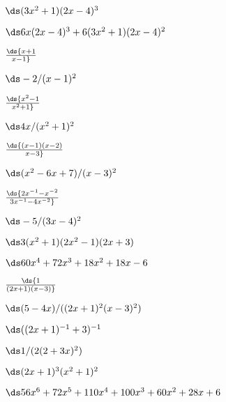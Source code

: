\begin{enumialphparenastyle}
\begin{ex}  $\ds (3x^2+1)(2x-4)^3$
\begin{sol} 
$\ds 6x(2x-4)^3+6(3x^2+1)(2x-4)^2$
\end{sol}
\end{ex}

\begin{ex}  $\ds{x+1\over x-1}$
\begin{sol} 
$\ds -2/(x-1)^2$
\end{sol}
\end{ex}

\begin{ex}  $\ds{x^2-1\over x^2+1}$
\begin{sol} 
$\ds 4x/(x^2+1)^2$
\end{sol}
\end{ex}

\begin{ex}  $\ds{(x-1)(x-2)\over x-3}$
\begin{sol} 
$\ds (x^2-6x+7)/(x-3)^2$
\end{sol}
\end{ex}

\begin{ex}  $\ds{2x^{-1}-x^{-2}\over 3x^{-1}-4x^{-2}}$
\begin{sol} 
$\ds -5/(3x-4)^2$
\end{sol}
\end{ex}

\begin{ex}  $\ds 3(x^2+1)(2x^2-1)(2x+3)$
\begin{sol} 
$\ds 60x^4+72x^3+18x^2+18x-6$
\end{sol}
\end{ex}

\begin{ex}  $\ds{1\over (2x+1)(x-3)}$
\begin{sol} 
$\ds (5-4x)/((2x+1)^2(x-3)^2)$
\end{sol}
\end{ex}

\begin{ex}  $\ds ((2x+1)^{-1}+3)^{-1}$
\begin{sol} 
$\ds 1/(2(2+3x)^2)$
\end{sol}
\end{ex}

\begin{ex}  $\ds (2x+1)^3(x^2+1)^2$
\begin{sol} 
$\ds 56x^6+72x^5+110x^4+100x^3+60x^2+28x+6$
\end{sol}
\end{ex}


\end{enumialphparenastyle}
